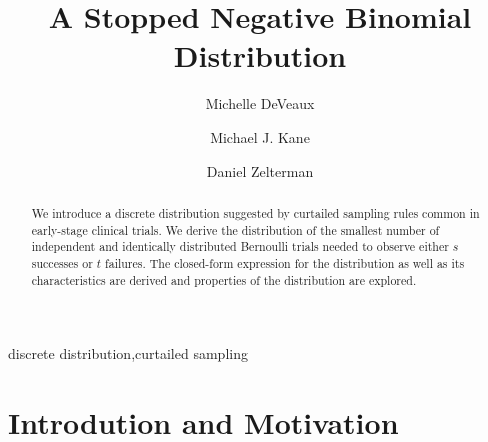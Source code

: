 \documentclass[review]{elsarticle}
\begin{document}
\begin{frontmatter}

\title{A Stopped Negative Binomial Distribution}


\author[mymainaddress]{Michelle DeVeaux}

\author[mymainaddress]{Michael J. Kane}

\author[mymainaddress]{Daniel Zelterman}

\address[mymainaddress]{Department of Biostatistics\\ School of Epidemiology and Public Health\\ Yale University, New Haven, CT}

\begin{abstract}
We introduce a discrete distribution suggested by curtailed
sampling rules common in early-stage clinical trials. We derive the
distribution of the smallest number of independent and identically
distributed Bernoulli trials needed to observe either $s$ successes 
or $t$ failures. The closed-form expression for the distribution as well as 
its characteristics are derived and properties of the distribution are explored.
\end{abstract}

\begin{keyword}
discrete distribution\sep curtailed sampling
\end{keyword}

\end{frontmatter}

\linenumbers

\section{Introdution and Motivation}
\end{document}
